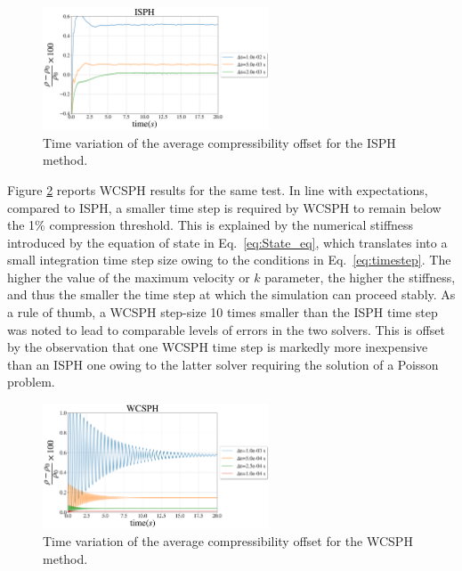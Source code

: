 \begin{figure}[H]
	\begin{center}
		\includegraphics[width=0.6\textwidth]{images/SPH_Comparison/Figure_compressibility_ISPH.png}
	\end{center}
	\caption{Time variation of the average compressibility offset for the ISPH method.}
	\label{fig:Compressibility_isph}
\end{figure}
Figure \ref{fig:Compressibility_wcsph} reports WCSPH results for the same test. In line with expectations, compared to ISPH, a smaller time step is required by WCSPH to remain below the 1\% compression threshold. This is explained by the numerical stiffness introduced by the equation of state in Eq.~\ref{eq:State_eq}, which translates into a small integration time step size owing to the conditions in Eq.~\ref{eq:timestep}. The higher the value of the maximum velocity or $k$ parameter, the higher the stiffness, and thus the smaller the time step at which the simulation can proceed stably. As a rule of thumb, a WCSPH step-size 10 times smaller than the ISPH time step was noted to lead to comparable levels of errors in the two solvers. This is offset by the observation that one WCSPH time step is markedly more inexpensive than an ISPH one owing to the latter solver requiring the solution of a Poisson problem.
\begin{figure}[H]
	\begin{center}
		\includegraphics[width=0.6\textwidth]{images/SPH_Comparison/Figure_compressibility_WCSPH.png}
	\end{center}
	\caption{Time variation of the average compressibility offset for the WCSPH method.}
	\label{fig:Compressibility_wcsph}
\end{figure}
